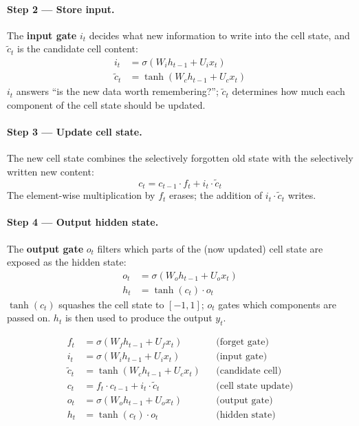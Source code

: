 \documentclass[11pt,a4paper]{article}
\theoremstyle{definition}
\theoremstyle{plain}
\theoremstyle{remark}
\begin{document}
\paragraph{Step 2 --- Store input.}
The \textbf{input gate} $i_t$ decides what new information to write into the cell state, and $\tilde{c}_t$ is the candidate cell content:
\begin{align}
    i_t &= \sigma(W_i h_{t-1} + U_i x_t) \\
    \tilde{c}_t &= \tanh(W_c h_{t-1} + U_c x_t)
\end{align}
$i_t$ answers ``is the new data worth remembering?''; $\tilde{c}_t$ determines how much each component of the cell state should be updated.

\paragraph{Step 3 --- Update cell state.}
The new cell state combines the selectively forgotten old state with the selectively written new content:
\[
    c_t = c_{t-1} \cdot f_t + i_t \cdot \tilde{c}_t
\]
The element-wise multiplication by $f_t$ erases; the addition of $i_t \cdot \tilde{c}_t$ writes.

\paragraph{Step 4 --- Output hidden state.}
The \textbf{output gate} $o_t$ filters which parts of the (now updated) cell state are exposed as the hidden state:
\begin{align}
    o_t &= \sigma(W_o h_{t-1} + U_o x_t) \\
    h_t &= \tanh(c_t) \cdot o_t
\end{align}
$\tanh(c_t)$ squashes the cell state to $[-1,1]$; $o_t$ gates which components are passed on. $h_t$ is then used to produce the output $y_t$.

\begin{tcolorbox}[colback=blue!5!white,colframe=blue!60!black,title={LSTM full equations summary}]
\begin{align*}
    f_t &= \sigma(W_f h_{t-1} + U_f x_t) & &\text{(forget gate)} \\
    i_t &= \sigma(W_i h_{t-1} + U_i x_t) & &\text{(input gate)} \\
    \tilde{c}_t &= \tanh(W_c h_{t-1} + U_c x_t) & &\text{(candidate cell)} \\
    c_t &= f_t \cdot c_{t-1} + i_t \cdot \tilde{c}_t & &\text{(cell state update)} \\
    o_t &= \sigma(W_o h_{t-1} + U_o x_t) & &\text{(output gate)} \\
    h_t &= \tanh(c_t) \cdot o_t & &\text{(hidden state)}
\end{align*}
\end{tcolorbox}
\end{document}
